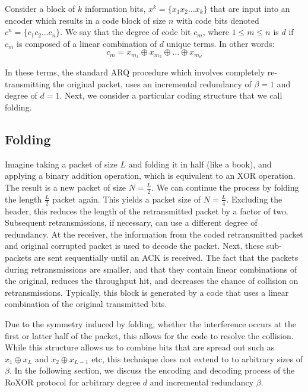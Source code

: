 Consider a block of $k$ information bits, $x^k=\{x_1x_2\dots x_k\}$ that are input into an encoder which results in a code block of size $n$ with code bits denoted $c^n=\{c_1c_2\dots c_n\}$. We say that the degree of code bit $c_m$, where $1 \leq m \leq n$ is $d$ if $c_m$ is composed of a linear combination of $d$ unique terms. In other words:
\begin{equation}
c_m=x_{m_1}\oplus x_{m_2} \oplus \dots \oplus x_{m_d}
\end{equation}

In these terms, the standard ARQ procedure which involves completely re-transmitting the original packet, uses an incremental redundancy of $\beta=1$ and degree of $d=1$. Next, we consider a particular coding structure that we call folding. 

\subsection{Folding}
\label{sec:folding}

Imagine taking a packet of size $L$ and folding it in half (like a book), and applying a binary addition operation, which is equivalent to an XOR operation. The result is a new packet of size $N=\frac{L}{2}$. We can continue the process by folding the length $\frac{L}{2}$ packet again. This yields a packet size of $N=\frac{L}{4}$. Excluding the header, this reduces the length of the retransmitted packet by a factor of two. Subsequent retransmissions, if necessary, can use a different degree of redundancy. At the receiver, the information from the coded retransmitted packet and original corrupted packet is used to decode the packet. Next,  these sub-packets are sent sequentially until an ACK is received. The fact that the packets during retransmissions are smaller, and that they contain linear combinations of the original, reduces the throughput hit, and decreases the chance of collision on retransmissions. Typically, this block is generated by a code that uses a linear combination of the original transmitted bits.

Due to the symmetry induced by folding, whether the interference occurs at the first or latter half of the packet, this allows for the code to resolve the collision. While this structure allows us to combine bits that are spread out such as $x_1 \oplus x_L$ and $x_2 \oplus x_{L-1}$ etc, this technique does not extend to to arbitrary sizes of $\beta$. In the following section, we discuss the encoding and decoding process of the RoXOR protocol for arbitrary degree $d$ and incremental redundancy $\beta$.

